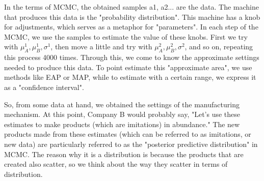 \documentclass{ltjsbook}
\begin{document}
In the terms of MCMC, the obtained samples a1, a2... are the data. The machine that produces this data is the "probability distribution". This machine has a knob for adjustments, which serves as a metaphor for "parameters". In each step of the MCMC, we use the samples to estimate the value of these knobs. First we try with $\mu_A^1,\mu_B^1,\sigma^1$, then move a little and try with $\mu_A^2,\mu_B^2,\sigma^2$, and so on, repeating this process 4000 times. Through this, we come to know the approximate settings needed to produce this data. To point estimate this "approximate area", we use methods like EAP or MAP, while to estimate with a certain range, we express it as a "confidence interval".

So, from some data at hand, we obtained the settings of the manufacturing mechanism. At this point, Company B would probably say, "Let's use these estimates to make products (which are imitations) in abundance." The new products made from these estimates (which can be referred to as imitations, or new data) are particularly referred to as the "posterior predictive distribution" in MCMC. The reason why it is a distribution is because the products that are created also scatter, so we think about the way they scatter in terms of distribution.
\end{document}
